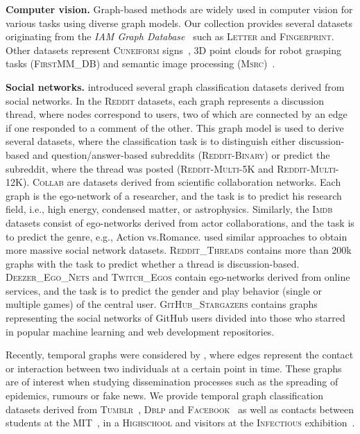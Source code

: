 \documentclass{article}
\newcommand{\xhdr}[1]{{\noindent\bfseries #1}}
\theoremstyle{definition}
\begin{document}
\xhdr{Computer vision.}
Graph-based methods are widely used in computer vision for various tasks using diverse graph models. Our collection provides several datasets originating from the \emph{IAM Graph Database}~\citep{Riesen2008} such as \textsc{Letter} and \textsc{Fingerprint}. Other datasets represent \textsc{Cuneiform} signs~\citep{Kriege2018}, 3D point clouds for robot grasping tasks (\textsc{FirstMM\_DB}) and semantic image processing (\textsc{Msrc})~\cite{Neu+2016}.

\xhdr{Social networks.}
\citet{Yan+2015a} introduced several graph classification datasets derived from social networks. In the \textsc{Reddit} datasets, each graph represents a discussion thread, where nodes correspond to users, two of which are connected by an edge if one responded to a comment of the other. This graph model is used to derive several datasets, where the classification task is to distinguish either discussion-based and question/answer-based subreddits (\textsc{Reddit-Binary}) or predict the subreddit, where the thread was posted (\textsc{Reddit-Multi-5K} and \textsc{Reddit-Multi-12K}). \textsc{Collab} are datasets derived from scientific collaboration networks. Each graph is the ego-network of a researcher, and the task is to predict his research field, i.e., high energy, condensed matter, or astrophysics. Similarly, the \textsc{Imdb} datasets consist of ego-networks derived from actor collaborations, and the task is to predict the genre, e.g.,  Action vs.\@ Romance.
\citet{Rozemberczki2020} used similar approaches to obtain more massive social network datasets. \textsc{Reddit\_Threads} contains more than 200k graphs with the task to predict whether a thread is discussion-based. \textsc{Deezer\_Ego\_Nets} and \textsc{Twitch\_Egos} contain ego-networks derived from online services, and the task is to predict the gender and play behavior (single or multiple games) of the central user.
\textsc{GitHub\_Stargazers} contains graphs representing the social networks of GitHub users divided into those who starred in popular machine learning and web development repositories.


Recently, temporal graphs were considered by \citet{Oettershagen2019}, where edges represent the contact or interaction between two individuals at a certain point in time. These graphs are of interest when studying dissemination processes such as the spreading of epidemics, rumours or fake news. We provide temporal graph classification datasets derived from \textsc{Tumblr}~\citep{rozenshtein2016reconstructing}, \textsc{Dblp} and \textsc{Facebook}~\citep{viswanath2009evolution} as well as contacts between students at the \textsc{MIT}~\cite{konect:eagle06}, in a \textsc{Highschool} and visitors at the \textsc{Infectious} exhibition~\citep{Isella2011}.
\end{document}
